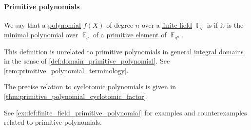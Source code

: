 \paragraph{Primitive polynomials}

\begin{definition}\label{def:finite_field_primitive_polynomial}
  We say that a \hyperref[def:polynomial_algebra/polynomials]{polynomial} \( f(X) \) of degree \( n \) over a \hyperref[def:finite_field]{finite field} \( \BbbF_q \) is  if it is the \hyperref[def:algebraic_element_minimal_polynomial]{minimal polynomial} over \( \BbbF_q \) of a \hyperref[def:finite_field_primitive_element]{primitive element} of \( \BbbF_{q^n} \).
\end{definition}
\begin{comments}
  \item This definition is unrelated to primitive polynomials in general \hyperref[def:integral_domain]{integral domains} in the sense of \cref{def:domain_primitive_polynomial}. See \cref{rem:primitive_polynomial_terminology}.

  \item The precise relation to \hyperref[def:cyclotomic_polynomial]{cyclotomic polynomials} is given in \cref{thm:primitive_polynomial_cyclotomic_factor}.

  \item See \cref{ex:def:finite_field_primitive_polynomial} for examples and counterexamples related to primitive polynomials.
\end{comments}

